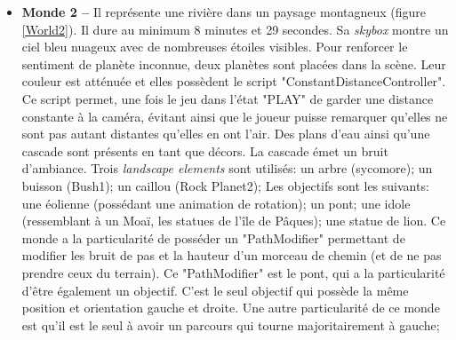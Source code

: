 \begin{itemize}
			\item \textbf{Monde 2 --} Il représente une rivière dans un paysage montagneux (figure \ref{World2}). Il dure au minimum 8 minutes et 29 secondes. Sa \textit{skybox} montre un ciel bleu nuageux avec de nombreuses étoiles visibles. Pour renforcer le sentiment de planète inconnue, deux planètes sont placées dans la scène. Leur couleur est atténuée et elles possèdent le script "ConstantDistanceController". Ce script permet, une fois le jeu dans l'état "PLAY" de garder une distance constante à la caméra, évitant ainsi que le joueur puisse remarquer qu'elles ne sont pas autant distantes qu'elles en ont l'air. Des plans d'eau ainsi qu'une cascade sont présents en tant que décors. La cascade émet un bruit d'ambiance. Trois \textit{landscape elements} sont utilisés: un arbre (sycomore); un buisson (Bush1); un caillou (Rock Planet2); Les objectifs sont les suivants: une éolienne (possédant une animation de rotation); un pont; une idole (ressemblant à un Moaï, les statues de l'île de Pâques); une statue de lion. Ce monde a la particularité de posséder un "PathModifier" permettant de modifier les bruit de pas et la hauteur d'un morceau de chemin (et de ne pas prendre ceux du terrain). Ce "PathModifier" est le pont, qui a la particularité d'être également un objectif. C'est le seul objectif qui possède la même position et orientation gauche et droite. Une autre particularité de ce monde est qu'il est le seul à avoir un parcours qui tourne majoritairement à gauche;\medskip		
			
			\begin{minipage}{\linewidth}
				\label{World2}
			\end{minipage}\medskip
			

\end{itemize}
